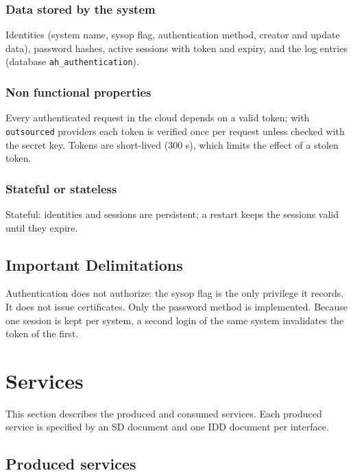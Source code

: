 \documentclass[a4paper]{arrowhead}
\begin{document}
\subsubsection{Data stored by the system}

Identities (system name, sysop flag, authentication method, creator and update data), password hashes, active sessions with token and expiry, and the log entries (database \texttt{ah\_\allowbreak{}authentication}).

\subsubsection{Non functional properties}

Every authenticated request in the cloud depends on a valid token; with \texttt{outsourced} providers each token is verified once per request unless checked with the secret key. Tokens are short-lived (300 s), which limits the effect of a stolen token.

\subsubsection{Stateful or stateless}

Stateful: identities and sessions are persistent; a restart keeps the sessions valid until they expire.

\subsection{Important Delimitations}
\label{sec:delimitations}

Authentication does not authorize: the sysop flag is the only privilege it records. It does not issue certificates. Only the password method is implemented. Because one session is kept per system, a second login of the same system invalidates the token of the first.

\newpage

\section{Services}
\label{sec:services}

This section describes the produced and consumed services. Each produced service is specified by an SD document and one IDD document per interface.

\subsection{Produced services}
\end{document}
